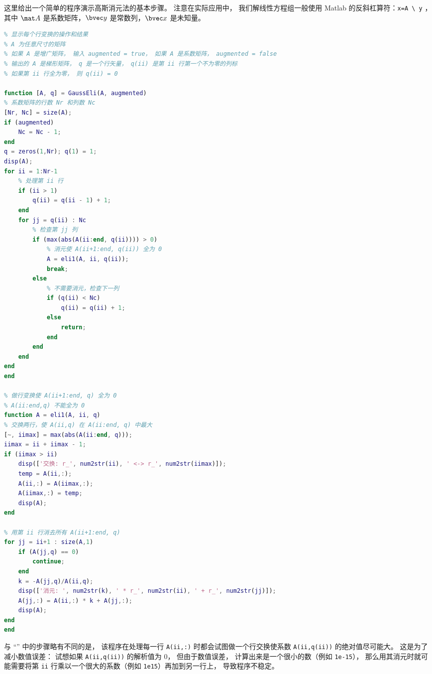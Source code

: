 


这里给出一个简单的程序演示高斯消元法的基本步骤。 注意在实际应用中， 我们解线性方程组一般使用 Matlab 的反斜杠算符：\verb`x=A \ y` ，其中 $\mat A$ 是系数矩阵，$\bvec y$ 是常数列，$\bvec x$ 是未知量。

\begin{lstlisting}[language=matlab, caption=GaussEli.m]
% 高斯消元法得到梯形系数矩阵
% 显示每个行变换的操作和结果
% A 为任意尺寸的矩阵
% 如果 A 是增广矩阵， 输入 augmented = true， 如果 A 是系数矩阵， augmented = false
% 输出的 A 是梯形矩阵， q 是一个行矢量， q(ii) 是第 ii 行第一个不为零的列标
% 如果第 ii 行全为零， 则 q(ii) = 0

function [A, q] = GaussEli(A, augmented)
% 系数矩阵的行数 Nr 和列数 Nc
[Nr, Nc] = size(A);
if (augmented)
    Nc = Nc - 1;
end
q = zeros(1,Nr); q(1) = 1;
disp(A);
for ii = 1:Nr-1
    % 处理第 ii 行
    if (ii > 1)
        q(ii) = q(ii - 1) + 1;
    end
    for jj = q(ii) : Nc
        % 检查第 jj 列
        if (max(abs(A(ii:end, q(ii)))) > 0)
            % 消元使 A(ii+1:end, q(ii)) 全为 0
            A = eli1(A, ii, q(ii));
            break;
        else
            % 不需要消元，检查下一列
            if (q(ii) < Nc)
                q(ii) = q(ii) + 1;
            else
                return;
            end
        end
    end
end
end

% 做行变换使 A(ii+1:end, q) 全为 0
% A(ii:end,q) 不能全为 0
function A = eli1(A, ii, q)
% 交换两行，使 A(ii,q) 在 A(ii:end, q) 中最大
[~, iimax] = max(abs(A(ii:end, q)));
iimax = ii + iimax - 1;
if (iimax > ii)
    disp(['交换: r_', num2str(ii), ' <-> r_', num2str(iimax)]);
    temp = A(ii,:);
    A(ii,:) = A(iimax,:);
    A(iimax,:) = temp;
    disp(A);
end

% 用第 ii 行消去所有 A(ii+1:end, q)
for jj = ii+1 : size(A,1)
    if (A(jj,q) == 0)
        continue;
    end
    k = -A(jj,q)/A(ii,q);
    disp(['消元: ', num2str(k), ' * r_', num2str(ii), ' + r_', num2str(jj)]);
    A(jj,:) = A(ii,:) * k + A(jj,:);
    disp(A);
end
end
\end{lstlisting}

与 “” 中的步骤略有不同的是， 该程序在处理每一行 \verb`A(ii,:)`  时都会试图做一个行交换使系数 \verb`A(ii,q(ii))` 的绝对值尽可能大。 这是为了减小数值误差： 试想如果 \verb`A(ii,q(ii))` 的解析值为 0， 但由于数值误差， 计算出来是一个很小的数（例如 \verb`1e-15`）， 那么用其消元时就可能需要将第 \verb`ii` 行乘以一个很大的系数（例如 \verb`1e15`）再加到另一行上， 导致程序不稳定。

